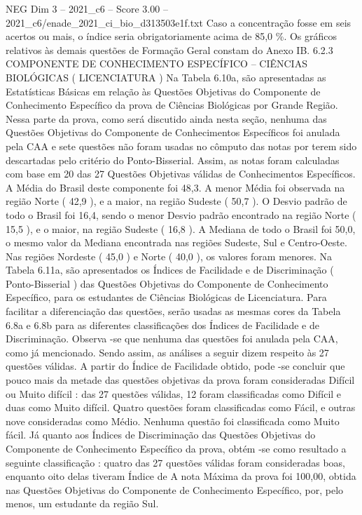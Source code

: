 \begin{textsample}{NEG Dim 3 – 2021\_c6 – Score 3.00 – 2021\_c6/enade\_2021\_ci\_bio\_d313503e1f.txt}
Caso a concentração fosse em seis acertos ou mais, o índice seria obrigatoriamente acima de 85,0 \%.
Os gráficos relativos às demais questões de Formação Geral constam do Anexo IB. 6.2.3 COMPONENTE DE CONHECIMENTO ESPECÍFICO – CIÊNCIAS BIOLÓGICAS ( LICENCIATURA ) Na Tabela 6.10a, são apresentadas as Estatísticas Básicas em relação às Questões Objetivas do Componente de Conhecimento Específico da prova de Ciências Biológicas por Grande Região.
Nessa parte da prova, como será discutido ainda nesta seção, nenhuma das Questões Objetivas do Componente de Conhecimentos Específicos foi anulada pela CAA e sete questões não foram usadas no cômputo das notas por terem sido descartadas pelo critério do Ponto-Bisserial.
Assim, as notas foram calculadas com base em 20 das 27 Questões Objetivas válidas de Conhecimentos Específicos.
A Média do Brasil deste componente foi 48,3.
A menor Média foi observada na região Norte ( 42,9 ), e a maior, na região Sudeste ( 50,7 ).
O Desvio padrão de todo o Brasil foi 16,4, sendo o menor Desvio padrão encontrado na região Norte ( 15,5 ), e o maior, na região Sudeste ( 16,8 ).
A Mediana de todo o Brasil foi 50,0, o mesmo valor da Mediana encontrada nas regiões Sudeste, Sul e Centro-Oeste.
Nas regiões Nordeste ( 45,0 ) e Norte ( 40,0 ), os valores foram menores.
Na Tabela 6.11a, são apresentados os Índices de Facilidade e de Discriminação ( Ponto-Bisserial ) das Questões Objetivas do Componente de Conhecimento Específico, para os estudantes de Ciências Biológicas de Licenciatura.
Para facilitar a diferenciação das questões, serão usadas as mesmas cores da Tabela 6.8a e 6.8b para as diferentes classificações dos Índices de Facilidade e de Discriminação.
Observa -se que nenhuma das questões foi anulada pela CAA, como já mencionado.
Sendo assim, as análises a seguir dizem respeito às 27 questões válidas.
A partir do Índice de Facilidade obtido, pode -se concluir que pouco mais da metade das questões objetivas da prova foram consideradas Difícil ou Muito difícil : das 27 questões válidas, 12 foram classificadas como Difícil e duas como Muito difícil.
Quatro questões foram classificadas como Fácil, e outras nove consideradas como Médio.
Nenhuma questão foi classificada como Muito fácil.
Já quanto aos Índices de Discriminação das Questões Objetivas do Componente de Conhecimento Específico da prova, obtém -se como resultado a seguinte classificação : quatro das 27 questões válidas foram consideradas boas, enquanto oito delas tiveram Índice de A nota Máxima da prova foi 100,00, obtida nas Questões Objetivas do Componente de Conhecimento Específico, por, pelo menos, um estudante da região Sul.

\end{textsample}
